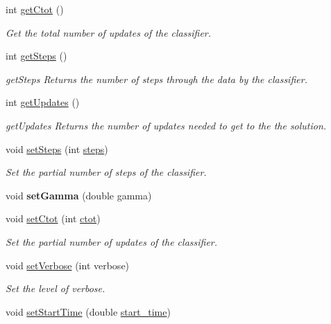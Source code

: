 \begin{DoxyCompactItemize}
int \hyperlink{class_classifier_ab80a78cd6a4efc59b16f5b80cd64dc63}{get\+Ctot} ()
\begin{DoxyCompactList}\small\item\em Get the total number of updates of the classifier. \end{DoxyCompactList}\item 
int \hyperlink{class_classifier_a1fb3e4dfd80c154e89603c8fa1b11b76}{get\+Steps} ()
\begin{DoxyCompactList}\small\item\em get\+Steps Returns the number of steps through the data by the classifier. \end{DoxyCompactList}\item 
int \hyperlink{class_classifier_a738c2fbed982db6cad02062edcc037e4}{get\+Updates} ()
\begin{DoxyCompactList}\small\item\em get\+Updates Returns the number of updates needed to get to the the solution. \end{DoxyCompactList}\item 
void \hyperlink{class_classifier_a779b6cac0351e272ee0573d919d5d060}{set\+Steps} (int \hyperlink{class_classifier_a1e4c9c9ba059d5aff1d4d81eb41725cb}{steps})
\begin{DoxyCompactList}\small\item\em Set the partial number of steps of the classifier. \end{DoxyCompactList}\item 
\mbox{\label{class_classifier_aa802b07331c79ff9621b6a802adbbc91}} 
void {\bfseries set\+Gamma} (double gamma)
\item 
void \hyperlink{class_classifier_a3293d7d39c3934503a23b920f84f73e7}{set\+Ctot} (int \hyperlink{class_classifier_a99d9a7f504212bb3dc2726c10a2333c6}{ctot})
\begin{DoxyCompactList}\small\item\em Set the partial number of updates of the classifier. \end{DoxyCompactList}\item 
void \hyperlink{class_classifier_a073b94029512378ccfae3aa34aae0212}{set\+Verbose} (int verbose)
\begin{DoxyCompactList}\small\item\em Set the level of verbose. \end{DoxyCompactList}\item 
void \hyperlink{class_classifier_a7f1cf3ac53b0593307a050368a912bb4}{set\+Start\+Time} (double \hyperlink{class_classifier_a4488a20bd7b4fc22d57244aaee57b002}{start\+\_\+time})

\end{DoxyCompactItemize}
